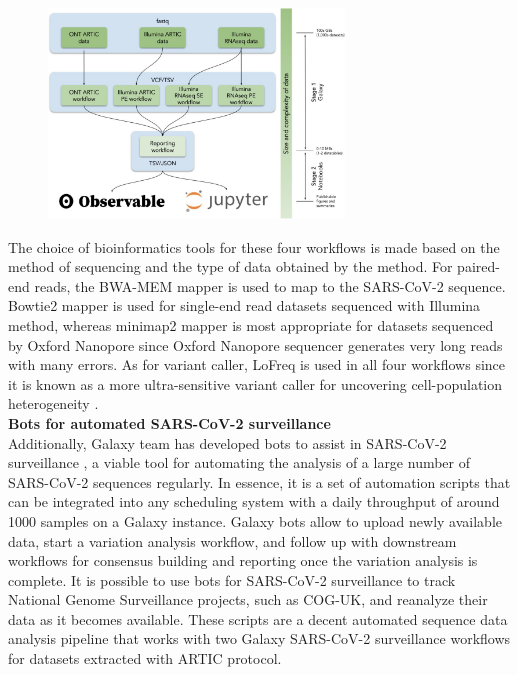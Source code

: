         \begin{figure}[h]
        	\centering
            \includegraphics[width=0.7\textwidth]{figures/intro/galaxy-analysis.jpg}
            \label{fig:intro:galaxy-effort}
        \end{figure}
        
        The choice of bioinformatics tools for these four workflows is made based on the method of sequencing and the type of data obtained by the method. For paired-end reads, the BWA-MEM \cite{li2013,burrows} mapper is used to map to the SARS-CoV-2 sequence. Bowtie2 \cite{ultrafast,langmead2012} mapper is used for single-end read datasets sequenced with Illumina method, whereas minimap2 \cite{burrows,li2018} mapper is most appropriate for datasets sequenced by Oxford Nanopore since Oxford Nanopore sequencer generates very long reads with many errors. As for variant caller, LoFreq is used in all four workflows since it is known as a more ultra-sensitive variant caller for uncovering cell-population heterogeneity \cite{lofreq}.\\

        \textbf{Bots for automated SARS-CoV-2 surveillance } \\
        
        Additionally, Galaxy team has developed bots to assist in SARS-CoV-2 surveillance \cite{bots2022}, a viable tool for automating the analysis of a large number of SARS-CoV-2 sequences regularly. In essence, it is a set of automation scripts that can be integrated into any scheduling system with a daily throughput of around 1000 samples on a Galaxy instance. Galaxy bots allow to upload newly available data, start a variation analysis workflow, and follow up with downstream workflows for consensus building and reporting once the variation analysis is complete. It is possible to use bots for SARS-CoV-2 surveillance to track National Genome Surveillance projects, such as COG-UK, and reanalyze their data as it becomes available. These scripts are a decent automated sequence data analysis pipeline that works with two Galaxy SARS-CoV-2 surveillance workflows for datasets extracted with ARTIC protocol. 
        
